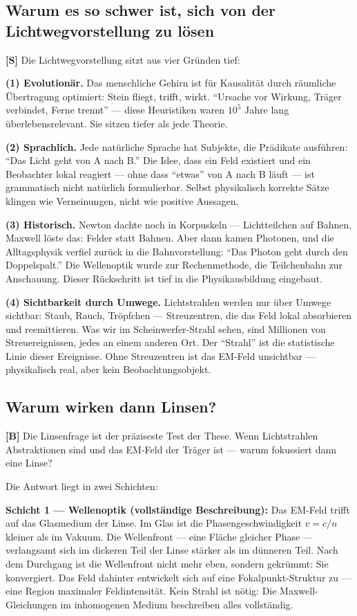 \subsection{Warum es so schwer ist, sich von der Lichtwegvorstellung zu lösen}

\textbf{[S]} Die Lichtwegvorstellung sitzt aus vier Gründen tief:

\textbf{(1) Evolutionär.} Das menschliche Gehirn ist für Kausalität
durch räumliche Übertragung optimiert: Stein fliegt, trifft, wirkt.
``Ursache vor Wirkung, Träger verbindet, Ferne trennt'' --- diese
Heuristiken waren $10^5$ Jahre lang überlebensrelevant. Sie sitzen
tiefer als jede Theorie.

\textbf{(2) Sprachlich.} Jede natürliche Sprache hat Subjekte, die
Prädikate ausführen: ``Das Licht geht von A nach B.'' Die Idee, dass
ein Feld existiert und ein Beobachter lokal reagiert --- ohne dass
``etwas'' von A nach B läuft --- ist grammatisch nicht natürlich
formulierbar. Selbst physikalisch korrekte Sätze klingen wie
Verneinungen, nicht wie positive Aussagen.

\textbf{(3) Historisch.} Newton dachte noch in Korpuskeln --- Lichtteilchen
auf Bahnen. Maxwell löste das: Felder statt Bahnen. Aber dann kamen
Photonen, und die Alltagsphysik verfiel zurück in die Bahnvorstellung:
``Das Photon geht durch den Doppelspalt.'' Die Wellenoptik wurde zur
Rechenmethode, die Teilchenbahn zur Anschauung. Dieser Rückschritt ist
tief in die Physikausbildung eingebaut.

\textbf{(4) Sichtbarkeit durch Umwege.} Lichtstrahlen werden nur über
Umwege sichtbar: Staub, Rauch, Tröpfchen --- Streuzentren, die das
Feld lokal absorbieren und reemittieren. Was wir im Scheinwerfer-Strahl
sehen, sind Millionen von Streuereignissen, jedes an einem anderen Ort.
Der ``Strahl'' ist die statistische Linie dieser Ereignisse. Ohne
Streuzentren ist das EM-Feld unsichtbar --- physikalisch real, aber
kein Beobachtungsobjekt.

\subsection{Warum wirken dann Linsen?}

\textbf{[B]} Die Linsenfrage ist der präziseste Test der These.
Wenn Lichtstrahlen Abstraktionen sind und das EM-Feld der Träger
ist --- warum fokussiert dann eine Linse?

Die Antwort liegt in zwei Schichten:

\textbf{Schicht 1 --- Wellenoptik (vollständige Beschreibung):}
Das EM-Feld trifft auf das Glasmedium der Linse. Im Glas ist die
Phasengeschwindigkeit $v = c/n$ kleiner als im Vakuum. Die
Wellenfront --- eine Fläche gleicher Phase --- verlangsamt sich im
dickeren Teil der Linse stärker als im dünneren Teil. Nach dem
Durchgang ist die Wellenfront nicht mehr eben, sondern gekrümmt:
Sie konvergiert. Das Feld dahinter entwickelt sich auf eine
Fokalpunkt-Struktur zu --- eine Region maximaler Feldintensität.
Kein Strahl ist nötig: Die Maxwell-Gleichungen im inhomogenen
Medium beschreiben alles vollständig.

